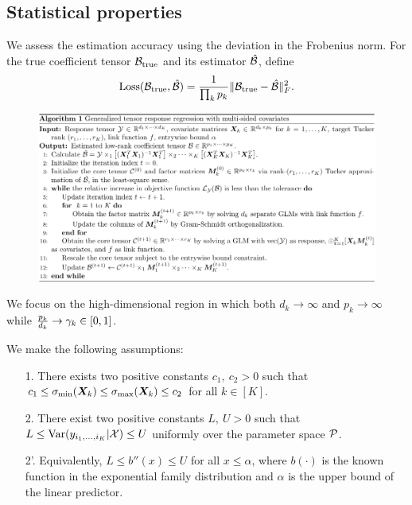 \documentclass[11pt]{article}
\theoremstyle{plain}
\theoremstyle{definition}
\begin{document}
\subsection{Statistical properties}
We assess the estimation accuracy using the deviation in the Frobenius norm. For the true coefficient tensor $\mathcal{B}_{\text{true}}$ and its estimator $\hat {\mathcal{B}}$, define
\[
\text{Loss}(\mathcal{B}_{\text{true}}, \hat {\mathcal{B}})={ 1 \over \prod_k p_k} \lVert\mathcal{B}_{\text{true}}- \hat {\mathcal{B}}\rVert_F^2.
\]

\begin{figure}
\begin{center}
\includegraphics[width=17.5cm]{figures/algorithm.pdf}
  \end{center}
  \end{figure}
  
We focus on the high-dimensional region in which both $d_k\to \infty$ and $p_k\to\infty$ while ${p_k\over d_k} \to \gamma_k \in[0,1]$. 
\begin{assumption}\label{ass}We make the following assumptions:
\begin{enumerate}
\item [1.] There exists two positive constants $c_1,\ c_2>0$ such that $c_1\leq \sigma_{\min}(\bm X_k)\leq  \sigma_{\max}(\bm X_k)\leq c_2$ for all $k\in[K]$.
\item [2.] There exist two positive constants $L,\ U>0$ such that $L\leq \text{Var}(y_{i_1,\ldots,i_K}|\mathcal{X})\leq U$ uniformly over the parameter space $\mathcal{P}$. 
\item [2'.] Equivalently, $L\leq b''(x) \leq U$ for all $x\leq \alpha$, where $b(\cdot)$ is the known function in the exponential family distribution and $\alpha$ is the upper bound of the linear predictor. 
\end{enumerate}
\end{assumption}
\end{document}
